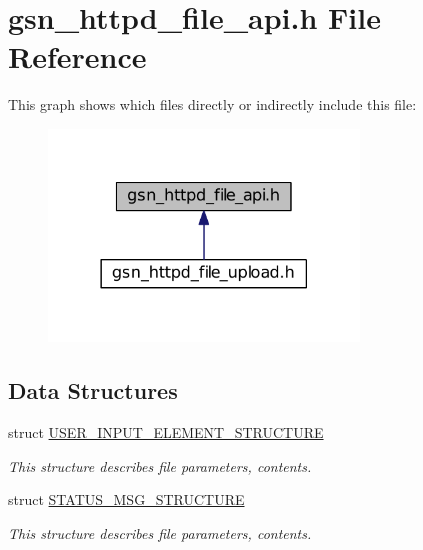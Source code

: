 \hypertarget{a00511}{
\section{gsn\_\-httpd\_\-file\_\-api.h File Reference}
\label{a00511}
}
This graph shows which files directly or indirectly include this file:
\nopagebreak
\begin{figure}[H]
\begin{center}
\leavevmode
\includegraphics[width=234pt]{a00743}
\end{center}
\end{figure}
\subsection*{Data Structures}
\begin{DoxyCompactItemize}
\item 
struct \hyperlink{a00463}{USER\_\-INPUT\_\-ELEMENT\_\-STRUCTURE}
\begin{DoxyCompactList}\small\item\em This structure describes file parameters, contents. \end{DoxyCompactList}\item 
struct \hyperlink{a00461}{STATUS\_\-MSG\_\-STRUCTURE}
\begin{DoxyCompactList}\small\item\em This structure describes file parameters, contents. \end{DoxyCompactList}\end{DoxyCompactItemize}

